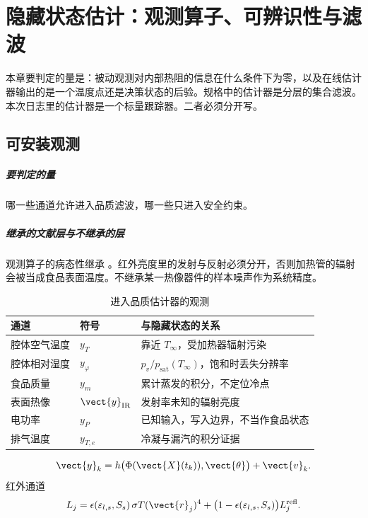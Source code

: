\chapter{隐藏状态估计：观测算子、可辨识性与滤波}
\label{ch:est}

本章要判定的量是：被动观测对内部热阻的信息在什么条件下为零，以及在线估计器输出的是一个温度点还是决策状态的后验。规格中的估计器是分层的集合滤波。本次日志里的估计器是一个标量跟踪器。二者必须分开写。

\section{可安装观测}

\paragraph{要判定的量}
哪一些通道允许进入品质滤波，哪一些只进入安全约束。

\paragraph{继承的文献层与不继承的层}
观测算子的病态性继承 \cite{ozisik2000}。红外亮度里的发射与反射必须分开，否则加热管的辐射会被当成食品表面温度。不继承某一热像器件的样本噪声作为系统精度。

\begin{table}[ht]
\centering
\caption{进入品质估计器的观测}
\begin{tabularx}{\textwidth}{llX}
\toprule
通道 & 符号 & 与隐藏状态的关系 \\
\midrule
腔体空气温度 & \(y_T\) & 靠近 \(T_\infty\)，受加热器辐射污染 \\
腔体相对湿度 & \(y_\varphi\) & \(p_v/p_{\mathrm{sat}}(T_\infty)\)，饱和时丢失分辨率 \\
食品质量 & \(y_m\) & 累计蒸发的积分，不定位冷点 \\
表面热像 & \(\vect{y}_{\mathrm{IR}}\) & 发射率未知的辐射亮度 \\
电功率 & \(y_P\) & 已知输入，写入边界，不当作食品状态 \\
排气温度 & \(y_{T,e}\) & 冷凝与漏汽的积分证据 \\
\bottomrule
\end{tabularx}
\end{table}

\begin{definition}[观测方程]
\begin{equation}
\label{eq:obs}
\vect{y}_k=h\big(\Phi(\vect{X}(t_k)),\vect{\theta}\big)+\vect{v}_k.
\end{equation}
红外通道
\begin{equation}
\label{eq:ir}
L_j=\epsilon(\varepsilon_{l,s},S_s)\,\sigma T(\vect{r}_j)^4
+\big(1-\epsilon(\varepsilon_{l,s},S_s)\big)L_j^{\mathrm{refl}}.
\end{equation}
\end{definition}

